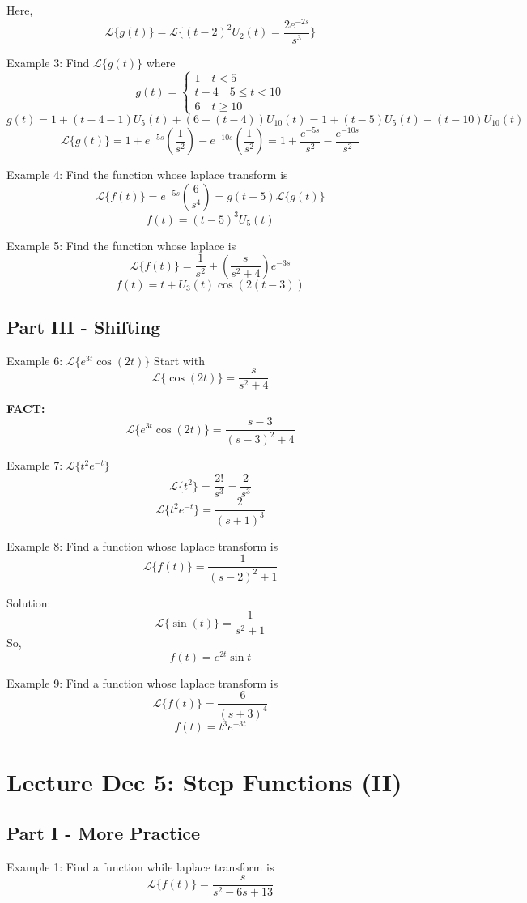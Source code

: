 \documentclass[12pt]{article}
\renewcommand{\L}[1]{\mathcal{L}\{#1\}}
\begin{document}
Here, 
\[\L{g(t)} = \L{(t - 2)^2 U_2(t) = \boxed{\frac{2e^{-2s}}{s^3}}}\]

Example 3: Find $\L{g(t)}$ where 
\[g(t) = \begin{cases}
    1 \quad t < 5\\
    t - 4 \quad 5 \leq t < 10\\
    6 \quad t \geq 10
\end{cases}\]
\[g(t) = 1 + (t- 4 - 1)U_5(t) + (6 - (t - 4))U_{10}(t) = 1 + (t - 5)U_5(t) - (t - 10)U_10(t)\]
\[\L{g(t)} = 1 + e^{-5s}\left(\frac{1}{s^2}\right) - e^{-10s}\left(\frac{1}{s^2}\right) = \boxed{1 + \frac{e^{-5s}}{s^2} - \frac{e^{-10s}}{s^2}}\]

Example 4: Find the function whose laplace transform is 
\[\L{f(t)} = e^{-5s} \left(\frac{6}{s^4}\right) = g(t - 5) \L{g(t)} \]
\[\boxed{f(t) = (t - 5)^3 U_5(t)}\]

Example 5: Find the function whose laplace is 
\[\L{f(t)} = \frac{1}{s^2} + \left(\frac{s}{s^2 + 4}\right) e^{-3s}\]
\[\boxed{f(t) = t + U_3(t)\cos(2(t - 3))}\]

\subsection*{Part III - Shifting}
Example 6: $\L{e^{3t} \cos (2t)}$
Start with 
\[\L{\cos(2t)} = \frac{s}{s^2 + 4}\]

\textbf{FACT:}
\[\boxed{\L{e^{3t} \cos(2t)} = \frac{s - 3}{(s - 3)^2 + 4}}\]

Example 7: $\L{t^2 e^{-t}}$
\[\L{t^2} = \frac{2!}{s^3} = \frac{2}{s^3}\]
\[\boxed{\L{t^2 e^{-t}} = \frac{2}{(s + 1)^3}}\]

Example 8: Find a function whose laplace transform is 
\[\L{f(t)} = \frac{1}{(s- 2)^2 + 1}\]

Solution:
\[\L{\sin(t)} = \frac{1}{s^2 + 1}\]
So, 
\[\boxed{f(t) = e^{2t} \sin t}\]

Example 9: Find a function whose laplace transform is 
\[\L{f(t)} = \frac{6}{(s + 3)^4}\]
\[\boxed{f(t) = t^3e^{-3t}}\]

\section{Lecture Dec 5: Step Functions (II)}
\subsection*{Part I - More Practice}
Example 1: Find a function while laplace transform is 
\[\L{f(t)} = \frac{s}{s^2 - 6s + 13}\]
\end{document}
